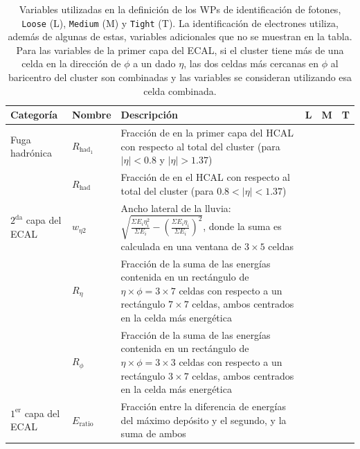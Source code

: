 \begin{table}
\centering 
\caption{Variables utilizadas en la definición de los WPs de identificación de fotones, \texttt{Loose} (L), \texttt{Medium} (M) y \texttt{Tight} (T). La identificación de electrones utiliza, además de algunas de estas, variables adicionales que no se muestran en la tabla. Para las variables de la primer capa del ECAL, si el cluster tiene más de una celda en la dirección de $\phi$ a un dado $\eta$, las dos celdas más cercanas en $\phi$ al baricentro del cluster son combinadas y las variables se consideran utilizando esa celda combinada. }
	\begin{tabular}{ l p{2cm} p{8cm} c c c}

		Categoría & Nombre & Descripción & L & M & T \\

		\hline
		\hline

		Fuga hadrónica & $R_{\text{had}_{1}}$ & Fracción de \ET en la primer capa del HCAL con respecto al \ET total del cluster (para $|\eta|<0.8$ y $|\eta|>1.37$) & \cmark & \cmark & \cmark\\

		 & $R_{\text{had}}$ & Fracción de \ET en el HCAL con respecto al \ET total del cluster (para $0.8<|\eta|<1.37$) & \cmark & \cmark & \cmark \\

		\hline
		
		$2^{\text{da}}$ capa del ECAL  & $w_{\eta 2}$ & Ancho lateral de la lluvia: $\sqrt{\frac{\Sigma E_{i}\eta_{i}^{2}}{\Sigma E_{i}}-(\frac{\Sigma E_{i}\eta_{i}}{\Sigma E_{i}})^{2}}$, donde la suma es calculada en una ventana de $3\times5$ celdas & \cmark & \cmark & \cmark \\

		 & $R_{\eta}$ & Fracción de la suma de las energías contenida en un rectángulo de $\eta\times\phi = 3\times7$ celdas con respecto a un rectángulo $7\times7$ celdas, ambos centrados en la celda más energética & \cmark & \cmark & \cmark \\

		 & $R_{\phi}$ & Fracción de la suma de las energías contenida en un rectángulo de $\eta\times\phi = 3\times3$ celdas con respecto a un rectángulo $3\times7$ celdas, ambos centrados en la celda más energética & \xmark & \xmark & \cmark \\

		\hline


		$1^{\text{er}}$ capa del ECAL & $E_{\text{ratio}}$ & Fracción entre la diferencia de energías del máximo depósito y el segundo, y la suma de ambos & \xmark & \cmark & \cmark \\


\end{tabular}
\end{table}
